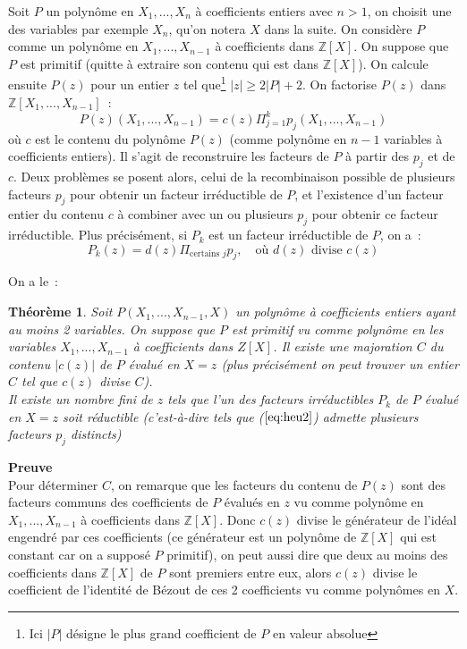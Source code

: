 \documentclass[a4paper,11pt]{article}
\newtheorem{thm}{Théorème}
\begin{document}
\begin{giacjshere}
Soit $P$ un polynôme en $X_1,...,X_n$ à coefficients entiers avec $n>1$,
on choisit une des variables par exemple $X_n$, qu'on notera $X$ dans la suite.
On considère $P$ comme un polynôme en $X_1,...,X_{n-1}$ à coefficients dans 
$\mathbb{Z}[X]$. On suppose que $P$ est primitif (quitte à extraire
son contenu qui est dans $\mathbb{Z}[X]$). On calcule ensuite
$P(z)$ pour un entier $z$ tel que\footnote{Ici $|P|$ désigne le plus grand
coefficient de $P$ en valeur absolue} $|z| \geq 2|P|+2$. On factorise $P(z)$
dans $\mathbb{Z}[X_1,...,X_{n-1}]$~:
\begin{equation} \label{eq:heu1}
 P(z)(X_1,...,X_{n-1})=c(z) \Pi_{j=1}^k p_j(X_1,...,X_{n-1})
\end{equation}
où $c$ est le contenu du polynôme $P(z)$ (comme polynôme en $n-1$ 
variables à coefficients entiers). Il s'agit de reconstruire les facteurs
de $P$ à partir des $p_j$ et de $c$. Deux problèmes se posent alors,
celui de la recombinaison possible de plusieurs facteurs $p_j$ pour
obtenir un facteur irréductible de $P$, et l'existence d'un facteur entier du
contenu $c$ à combiner avec un ou plusieurs $p_j$ pour obtenir ce
facteur irréductible. Plus précisément, si $P_k$ est un facteur 
irréductible de $P$, on a~:
\begin{equation} \label{eq:heu2}
 P_k(z)=d(z) \Pi_{\mbox{certains } j} p_j, \quad \mbox{où } 
d(z) \mbox{ divise } c(z)
\end{equation}

On a le~:
\begin{thm}
Soit $P(X_1,...,X_{n-1},X)$ un polynôme à coefficients 
entiers ayant au moins 2 variables. On suppose que $P$ est primitif
vu comme polynôme en les variables $X_1,...,X_{n-1}$
à coefficients dans $Z[X]$.
Il existe une majoration $C$ du contenu $|c(z)|$ de $P$ évalué en $X=z$
(plus précisément on peut trouver un entier $C$ tel que $c(z)$ divise
$C$).\\
Il existe un nombre fini de $z$ tels que l'un des facteurs irréductibles
$P_k$ de $P$ évalué en $X=z$ soit
réductible (c'est-à-dire tels que (\(\ref{eq:heu2}\)) admette 
plusieurs facteurs $p_j$ distincts)
\end{thm}

{\bf Preuve}\\
Pour déterminer $C$, on remarque que les facteurs du contenu de $P(z)$
sont des facteurs communs des coefficients de $P$ évalués en $z$
vu comme polynôme en $X_1,...,X_{n-1}$ à coefficients dans $\mathbb{Z}[X]$.
Donc $c(z)$ divise le générateur de l'idéal engendré par ces coefficients
(ce générateur est un polynôme de $\mathbb{Z}[X]$ qui est constant car on a supposé
$P$ primitif), on peut aussi dire que deux au moins des coefficients
dans $\mathbb{Z}[X]$ de $P$ sont premiers entre eux, alors $c(z)$ divise le
coefficient de l'identité de Bézout de ces 2 coefficients vu
comme polynômes en $X$.


\end{giacjshere}
\end{document}
